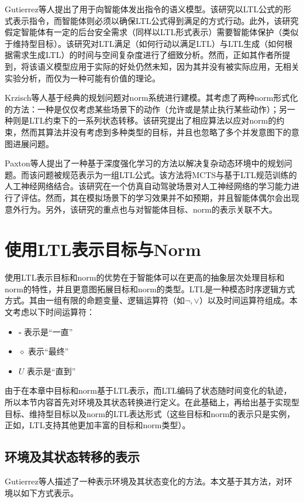 Gutierrez等人\cite{DBLP:conf/time/0001KPW22}提出了用于向智能体发出指令的语义模型。该研究以LTL公式的形式表示指令，而智能体则必须以确保LTL公式得到满足的方式行动。此外，该研究假定智能体有一定的后台安全需求（同样以LTL形式表示）需要智能体保护（类似于维持型目标）。该研究对LTL满足（如何行动以满足LTL）与LTL生成（如何根据需求生成LTL）的时间与空间复杂度进行了细致分析。然而，正如其作者所提到，将该语义模型应用于实际的好处仍然未知，因为其并没有被实际应用，无相关实验分析，而仅为一种可能有价值的理论。

Krzisch等人\cite{Krzisch2016}基于经典的规划问题对norm系统进行建模。其考虑了两种norm形式化的方法：一种是仅仅考虑某些场景下的动作（允许或是禁止执行某些动作）；另一种则是LTL约束下的一系列状态转移。该研究提出了相应算法以应对norm的约束，然而其算法并没有考虑到多种类型的目标，并且也忽略了多个并发意图下的意图进展问题。

Paxton等人\cite{DBLP:journals/corr/PaxtonRHK17}提出了一种基于深度强化学习的方法以解决复杂动态环境中的规划问题。而该问题被规范表示为一组LTL公式。该方法将MCTS与基于LTL规范训练的人工神经网络结合。该研究在一个仿真自动驾驶场景对人工神经网络的学习能力进行了评估。然而，其在模拟场景下的学习效果并不如预期，并且智能体偶尔会出现意外行为。另外，该研究的重点也与对智能体目标、norm的表示关联不大。


\section{使用LTL表示目标与Norm}
使用LTL表示目标和norm的优势在于智能体可以在更高的抽象层次处理目标和norm的特性，并且更意图拓展目标和norm的类型。LTL是一种模态时序逻辑方式方式。其由一组有限的命题变量、逻辑运算符（如$\lnot, \lor$）以及时间运算符组成。本文考虑以下时间运算符：
\begin{itemize}
    \item $\square$ 表示是“一直”
    \item $\diamond$ 表示“最终”
    \item $U$ 表示是“直到”
\end{itemize}
由于在本章中目标和norm基于LTL表示，而LTL编码了状态随时间变化的轨迹，所以本节内容首先对环境及其状态转换进行定义。在此基础上，再给出基于实现型目标、维持型目标以及norm的LTL表达形式（这些目标和norm的表示只是实例，正如\cite{DBLP:conf/atal/DastaniRW11}，LTL支持其他更加丰富的目标和norm类型）。

\subsection{环境及其状态转移的表示}
Gutierrez等人\cite{DBLP:conf/time/0001KPW22}描述了一种表示环境及其状态变化的方法。本文基于其方法，对环境以如下方式表示。

